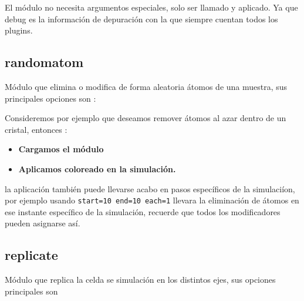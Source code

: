 El m\'odulo no necesita argumentos especiales, solo ser llamado y aplicado. Ya
que debug es la informaci\'on de depuraci\'on con la que siempre cuentan todos
los plugins.

\subsection{randomatom}
M\'odulo que elimina o modifica de forma aleatoria \'atomos de una muestra, sus
principales opciones son : 


Consideremos por ejemplo que deseamos remover \'atomos al azar dentro de un
cristal, entonces :

\begin{itemize}
 \item \textbf{Cargamos el m\'odulo}
 \item \textbf{Aplicamos coloreado en la simulaci\'on.}
\end{itemize}

la aplicaci\'on tambi\'en puede llevarse acabo en pasos espec\'ificos de la
simulaci\'ion, por ejemplo usando \texttt{start=10 end=10 each=1} llevara la
eliminaci\'on de \'atomos en ese instante espec\'ifico de la simulaci\'on,
recuerde que todos los modificadores pueden asignarse as\'i.

\subsection{replicate}
M\'odulo que replica la celda se simulaci\'on en los distintos ejes, sus
opciones principales son

